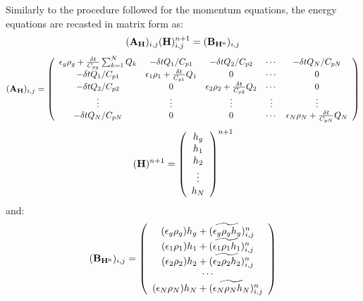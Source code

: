 Similarly to the procedure followed for the momentum equations, the energy equations
are recasted in matrix form as:
%
\begin{eqnarray}
\htmlimage{}
({\bf A_H})_{i,j} ({\bf H})_{i,j}^{n+1} = ({\bf B_{H^{\rm n}}})_{i,j}
\nonumber
\end{eqnarray}
%
\begin{eqnarray}
({\bf A_H})_{i,j} = \left ( \begin{array}{ccccc}
\epsilon_g \rho_g + \frac{\delta t}{C_{pg}} \sum_{k=1}^{N} Q_{k} & -\delta t Q_1/ C_{p1} & -\delta t Q_2/ C_{p2}  & \cdots & -\delta t Q_N/ C_{pN} \\
-\delta t Q_1/ C_{p1} & \epsilon_1 \rho_1 + \frac{\delta t}{C_{p1}} Q_{1} & 0 & \cdots & 0  \\
-\delta t Q_2/ C_{p2} & 0 & \epsilon_2 \rho_2 + \frac{\delta t}{C_{p2}} Q_{2} & \cdots & 0  \\
\vdots  & \vdots  & \vdots  & \vdots  & \vdots   \\
-\delta t Q_N/ C_{pN} &  0  &  0  &  \cdots   & \epsilon_N \rho_N + \frac{\delta t}{C_{pN}} Q_{N}
\end{array} \right )
\nonumber
\end{eqnarray}
%
\begin{eqnarray}
\htmlimage{}
({\bf H})^{n+1} =  \left( \begin{array}{c}
h_g \\
h_1 \\
h_2 \\
\vdots \\
h_N \end{array} \right )^{n+1} 
\nonumber
\end{eqnarray}
%
and:
%
\begin{eqnarray}
\htmlimage{}
({\bf B_{H^{\rm n}}})_{i,j}=  \left ( \begin{array}{c}
(\epsilon_g \rho_g) h_g + (\widetilde{\epsilon_g \rho_g h_g})^n_{i,j} \\
(\epsilon_1 \rho_1) h_1 + (\widetilde{\epsilon_1 \rho_1 h_1})^n_{i,j} \\
(\epsilon_2 \rho_2) h_2 + (\widetilde{\epsilon_2 \rho_2 h_2})^n_{i,j} \\
\cdots \\
(\epsilon_N \rho_N) h_N + (\widetilde{\epsilon_N \rho_N h_N})^n_{i,j} \\
\end{array} \right )
\nonumber
\end{eqnarray}
%
\newpage


